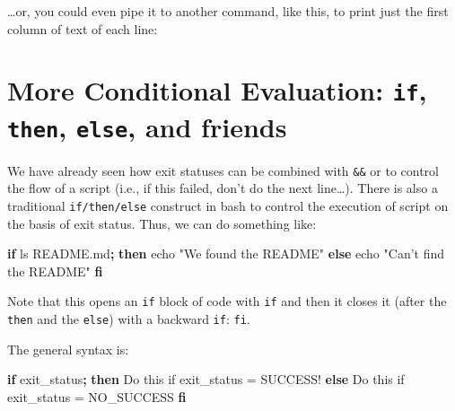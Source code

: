 \documentclass[]{krantz}
\makeatletter
\newenvironment{Shaded}{\begin{snugshade}}{\end{snugshade}}
\newcommand{\BuiltInTok}[1]{#1}
\newcommand{\ExtensionTok}[1]{#1}
\newcommand{\FunctionTok}[1]{\textcolor[rgb]{0,0,0}{#1}}
\newcommand{\KeywordTok}[1]{\textcolor[rgb]{0.27,0.27,0.27}{\textbf{#1}}}
\newcommand{\NormalTok}[1]{#1}
\newcommand{\StringTok}[1]{\textcolor[rgb]{0.5,0.5,0.5}{#1}}
\newcommand{\VariableTok}[1]{\textcolor[rgb]{0,0,0}{#1}}
\newenvironment{kframe}{%
\medskip{}
\setlength{\fboxsep}{.8em}
 \def\at@end@of@kframe{}%
 \ifinner\ifhmode%
  \def\at@end@of@kframe{\end{minipage}}%
  \begin{minipage}{\columnwidth}%
 \fi\fi%
 \def\FrameCommand##1{\hskip\@totalleftmargin \hskip-\fboxsep
 \colorbox{shadecolor}{##1}\hskip-\fboxsep
     \hskip-\linewidth \hskip-\@totalleftmargin \hskip\columnwidth}%
 \MakeFramed {\advance\hsize-\width
   \@totalleftmargin\z@ \linewidth\hsize
   \@setminipage}}%
 {\par\unskip\endMakeFramed%
 \at@end@of@kframe}
\renewenvironment{Shaded}{\begin{kframe}}{\end{kframe}}
\makeatother
\begin{document}
\ldots{}or, you could even pipe it to another command, like this, to print just the
first column of text of each line:

\begin{Shaded}
\end{Shaded}

\hypertarget{more-conditional-evaluation-if-then-else-and-friends}{%
\section{\texorpdfstring{More Conditional Evaluation: \texttt{if}, \texttt{then}, \texttt{else}, and friends}{More Conditional Evaluation: if, then, else, and friends}}\label{more-conditional-evaluation-if-then-else-and-friends}}

We have already seen how exit statuses can be combined with
\texttt{\&\&} or \texttt{\textbar{}\textbar{}} to control the flow of a script (i.e., if this
failed, don't do the next line\ldots{}). There is also a traditional
\texttt{if/then/else} construct in bash to control the execution of script
on the basis of exit status. Thus, we can do something like:

\begin{Shaded}
\begin{Highlighting}[]
\KeywordTok{if} \FunctionTok{ls}\NormalTok{ README.md}\KeywordTok{;} \KeywordTok{then}
  \BuiltInTok{echo} \StringTok{"We found the README"}
\KeywordTok{else}
  \BuiltInTok{echo} \StringTok{"Can't find the README"}
\KeywordTok{fi}
\end{Highlighting}
\end{Shaded}

Note that this opens an \texttt{if} block of code with \texttt{if} and then
it closes it (after the \texttt{then} and the \texttt{else}) with a backward
\texttt{if}: \texttt{fi}.

The general syntax is:

\begin{Shaded}
\begin{Highlighting}[]
\KeywordTok{if} \ExtensionTok{exit_status}\KeywordTok{;} \KeywordTok{then}
  \ExtensionTok{Do}\NormalTok{ this if exit_status = SUCCESS!}
\KeywordTok{else}
  \ExtensionTok{Do}\NormalTok{ this if exit_status = NO_SUCCESS}
\KeywordTok{fi}
\end{Highlighting}
\end{Shaded}
\end{document}
